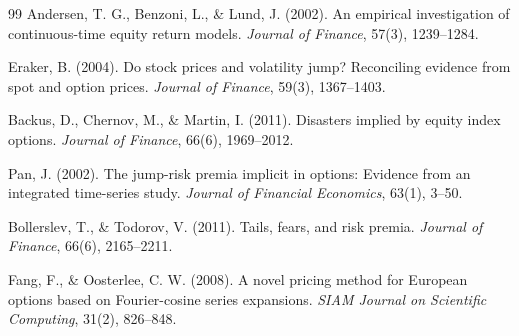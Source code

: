 \documentclass[12pt]{article}
\begin{document}
\begin{thebibliography}{99}
Andersen, T. G., Benzoni, L., \& Lund, J. (2002).
An empirical investigation of continuous-time equity return models.
\textit{Journal of Finance}, 57(3), 1239--1284.

Eraker, B. (2004).
Do stock prices and volatility jump? Reconciling evidence from spot and option prices.
\textit{Journal of Finance}, 59(3), 1367--1403.

Backus, D., Chernov, M., \& Martin, I. (2011).
Disasters implied by equity index options.
\textit{Journal of Finance}, 66(6), 1969--2012.

Pan, J. (2002).
The jump-risk premia implicit in options: Evidence from an integrated time-series study.
\textit{Journal of Financial Economics}, 63(1), 3--50.

Bollerslev, T., \& Todorov, V. (2011).
Tails, fears, and risk premia.
\textit{Journal of Finance}, 66(6), 2165--2211.

Fang, F., \& Oosterlee, C. W. (2008).
A novel pricing method for European options based on Fourier-cosine series expansions.
\textit{SIAM Journal on Scientific Computing}, 31(2), 826--848.


\end{thebibliography}
\end{document}
